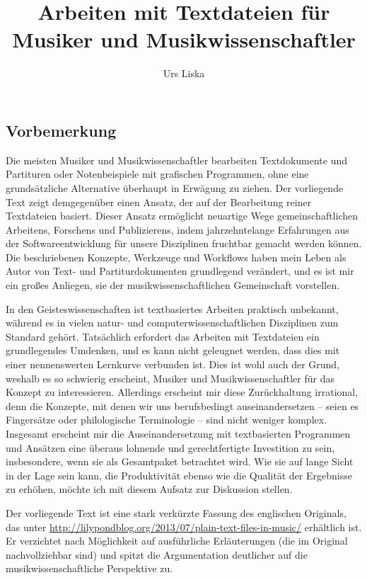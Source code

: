 \documentclass[DIV=12]{scrreprt}
\begin{document}
\title{Arbeiten mit Textdateien für Musiker und Musikwissenschaftler}
\author{Urs Liska}
\maketitle

\subsection*{Vorbemerkung}
Die meisten Musiker und Musikwissenschaftler bearbeiten Textdokumente und Partituren oder Notenbeispiele mit grafischen Programmen, ohne eine grundsätzliche Alternative überhaupt in Erwägung zu ziehen.
Der vorliegende Text zeigt demgegenüber einen Ansatz, der auf der Bearbeitung reiner Textdateien basiert.
Dieser Ansatz ermöglicht neuartige Wege gemeinschaftlichen Arbeitens, Forschens und Publizierens, indem jahrzehntelange Erfahrungen aus der Softwareentwicklung für unsere Disziplinen fruchtbar gemacht werden können.
Die beschriebenen Konzepte, Werkzeuge und Workflows haben mein Leben als Autor von Text- und Partiturdokumenten grundlegend verändert, und es ist mir ein großes Anliegen, sie der musikwissenschaftlichen Gemeinschaft vorstellen.

In den Geisteswissenschaften ist textbasiertes Arbeiten praktisch unbekannt, während es in vielen natur- und computerwissenschaftlichen Disziplinen zum Standard gehört.
Tatsächlich erfordert das Arbeiten mit Textdateien ein grundlegendes Umdenken, und es kann nicht geleugnet werden, dass dies mit einer nennenswerten Lernkurve verbunden ist.
Dies ist wohl auch der Grund, weshalb es so schwierig erscheint, Musiker und Musikwissenschaftler für das Konzept zu interessieren.
Allerdings erscheint mir diese Zurückhaltung irrational, denn die Konzepte, mit denen wir uns berufsbedingt auseinandersetzen -- seien es Fingersätze oder philologische Terminologie -- sind nicht weniger komplex.
Insgesamt erscheint mir die Auseinandersetzung mit textbasierten Programmen und Ansätzen eine überaus lohnende und gerechtfertigte Investition zu sein, insbesondere, wenn sie als Gesamtpaket betrachtet wird.
Wie sie auf lange Sicht in der Lage sein kann, die Produktivität ebenso wie die Qualität der Ergebnisse zu erhöhen, möchte ich mit diesem Aufsatz zur Diskussion stellen.

\medskip
Der vorliegende Text ist eine stark verkürzte Fassung des englischen Originals, das unter \url{http://lilypondblog.org/2013/07/plain-text-files-in-music/} erhältlich ist.
Er verzichtet nach Möglichkeit auf ausführliche Erläuterungen (die im Original nachvollziehbar sind) und spitzt die Argumentation deutlicher auf die musikwissenschaftliche Perspektive zu.
\end{document}
